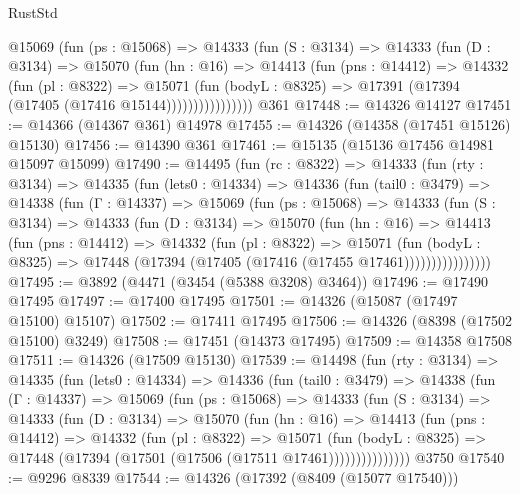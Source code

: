 \begin{lexlean}{RustStd}
\begin{coremodule}
              @15069
                (fun (ps : @15068) =>
                @14333
                  (fun (S : @3134) =>
                  @14333
                    (fun (D : @3134) =>
                    @15070
                      (fun (hn : @16) =>
                      @14413
                        (fun (pns : @14412) =>
                        @14332
                          (fun (pl : @8322) =>
                          @15071
                            (fun (bodyL : @8325) =>
                            @17391 (@17394 (@17405 (@17416 @15144))))))))))))))))
    @361
@17448 := @14326 @14127
@17451 := @14366 (@14367 @361) @14978
@17455 := @14326 (@14358 (@17451 @15126) @15130)
@17456 := @14390 @361
@17461 := @15135 (@15136 @17456 @14981 @15097 @15099)
@17490 := @14495
    (fun (rc : @8322) =>
    @14333
      (fun (rty : @3134) =>
      @14335
        (fun (lets0 : @14334) =>
        @14336
          (fun (tail0 : @3479) =>
          @14338
            (fun (Γ : @14337) =>
            @15069
              (fun (ps : @15068) =>
              @14333
                (fun (S : @3134) =>
                @14333
                  (fun (D : @3134) =>
                  @15070
                    (fun (hn : @16) =>
                    @14413
                      (fun (pns : @14412) =>
                      @14332
                        (fun (pl : @8322) =>
                        @15071
                          (fun (bodyL : @8325) =>
                          @17448 (@17394 (@17405 (@17416 (@17455 @17461))))))))))))))))
@17495 := @3892 (@4471 (@3454 (@5388 @3208) @3464))
@17496 := @17490 @17495
@17497 := @17400 @17495
@17501 := @14326 (@15087 (@17497 @15100) @15107)
@17502 := @17411 @17495
@17506 := @14326 (@8398 (@17502 @15100) @3249)
@17508 := @17451 (@14373 @17495)
@17509 := @14358 @17508
@17511 := @14326 (@17509 @15130)
@17539 := @14498
    (fun (rty : @3134) =>
    @14335
      (fun (lets0 : @14334) =>
      @14336
        (fun (tail0 : @3479) =>
        @14338
          (fun (Γ : @14337) =>
          @15069
            (fun (ps : @15068) =>
            @14333
              (fun (S : @3134) =>
              @14333
                (fun (D : @3134) =>
                @15070
                  (fun (hn : @16) =>
                  @14413
                    (fun (pns : @14412) =>
                    @14332
                      (fun (pl : @8322) =>
                      @15071
                        (fun (bodyL : @8325) =>
                        @17448 (@17394 (@17501 (@17506 (@17511 @17461)))))))))))))))
    @3750
@17540 := @9296 @8339
@17544 := @14326 (@17392 (@8409 (@15077 @17540)))

\end{coremodule}
\end{lexlean}
